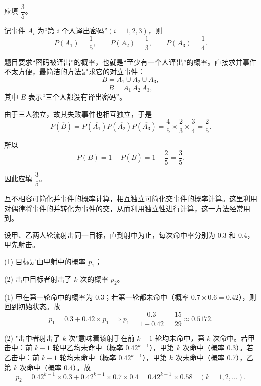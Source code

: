 ﻿\documentclass[lang=cn,11pt]{elegantbook}
\begin{document}
\begin{solution}
应填 \(\dfrac{3}{5}\)。

记事件 \(A_i\) 为“第 \(i\) 个人译出密码”\((i=1,2,3)\)，则
\[
P(A_1)=\frac15,\qquad P(A_2)=\frac13,\qquad P(A_3)=\frac14.
\]

题目要求“密码被译出”的概率，也就是“至少有一个人译出”的概率。直接求并事件不太方便，最简洁的方法是求它的对立事件：
\[
B=A_1\cup A_2\cup A_3,
\]
\[
\overline{B}=\overline{A_1}\,\overline{A_2}\,\overline{A_3},
\]
其中 \(\overline{B}\) 表示“三个人都没有译出密码”。

由于三人独立，故其失败事件也相互独立，于是
\[
P(\overline{B})
=P(\overline{A_1})P(\overline{A_2})P(\overline{A_3})
=\frac45\times\frac23\times\frac34
=\frac25.
\]

所以
\[
P(B)=1-P(\overline{B})=1-\frac25=\frac35.
\]

因此应填 \(\dfrac35\)。
\end{solution}

\begin{note}
互不相容可简化并事件的概率计算，相互独立可简化交事件的概率计算。这里利用对偶律将事件的并转化为事件的交，从而利用独立性进行计算，这一方法经常用到。
\end{note}

\begin{exercise}\label{exer:1-59}
设甲、乙两人轮流射击同一目标，直到射中为止，每次命中率分别为 0.3 和 0.4，甲先射击。\par
(1) 目标是由甲射中的概率 \(p_1\)；\par
(2) 击中目标者射击了 \(k\) 次的概率 \(p_2\)。
\end{exercise}

\begin{solution}
(1) 甲在第一轮命中的概率为 0.3；若第一轮都未命中（概率 \(0.7\times 0.6=0.42\)），则回到初始状态。故
\[
p_1 = 0.3 + 0.42\times p_1 \implies p_1 = \frac{0.3}{1-0.42} = \frac{15}{29} \approx 0.5172.
\]

(2) "击中者射击了 \(k\) 次"意味着该射手在前 \(k-1\) 轮均未命中，第 \(k\) 次命中。若甲击中：前 \(k-1\) 轮甲乙均未命中（概率 \(0.42^{k-1}\)），甲第 \(k\) 次命中（概率 0.3）。若乙击中：前 \(k-1\) 轮均未命中（概率 \(0.42^{k-1}\)），甲第 \(k\) 次未命中（概率 0.7），乙第 \(k\) 次命中（概率 0.4）。故
\[
p_2 = 0.42^{k-1}\times 0.3 + 0.42^{k-1}\times 0.7\times 0.4 = 0.42^{k-1}\times 0.58 \quad (k=1,2,\dots).
\]
\end{solution}
\end{document}
